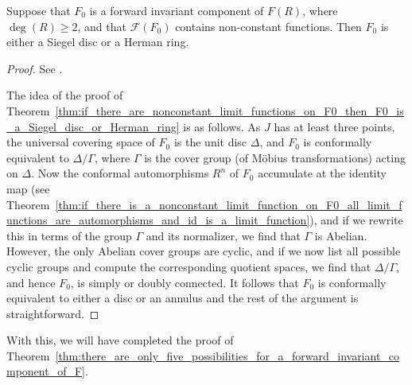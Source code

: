 \begin{theorem}
    \label{thm:if_there_are_nonconstant_limit_functions_on_F0_then_F0_is_a_Siegel_disc_or_Herman_ring}
    Suppose that $F_0$ is a forward invariant component of $F(R)$, where
    $\deg(R) \geq 2$, and that $\mathcal{F}(F_0)$ contains non-constant
    functions. Then $F_0$ is either a Siegel disc or a Herman ring.
\end{theorem}
\begin{proof}
    See \cite[167--170]{Beardon1991}.

    The idea of the proof of
    Theorem~\ref{thm:if_there_are_nonconstant_limit_functions_on_F0_then_F0_is_a_Siegel_disc_or_Herman_ring}
    is as follows. As $J$ has at least three points, the universal covering
    space of $F_0$ is the unit disc $\Delta$, and $F_0$ is conformally
    equivalent to $\Delta / \Gamma$, where $\Gamma$ is the cover group (of
    Möbius transformations) acting on $\Delta$. Now the conformal automorphisms
    $R^n$ of $F_0$ accumulate at the identity map (see
    Theorem~\ref{thm:if_there_is_a_nonconstant_limit_function_on_F0_all_limit_functions_are_automorphisms_and_id_is_a_limit_function}),
    and if we rewrite this in terms of the group $\Gamma$ and its normalizer, we
    find that $\Gamma$ is Abelian. However, the only Abelian cover groups are
    cyclic, and if we now list all possible cyclic groups and compute the
    corresponding quotient spaces, we find that $\Delta / \Gamma$, and hence
    $F_0$, is simply or doubly connected. It follows that $F_0$ is conformally
    equivalent to either a disc or an annulus and the rest of the argument is
    straightforward.
\end{proof}

\begin{remark}
    With this, we will have completed the proof of
    Theorem~\ref{thm:there_are_only_five_possibilities_for_a_forward_invariant_component_of_F}.
\end{remark}

